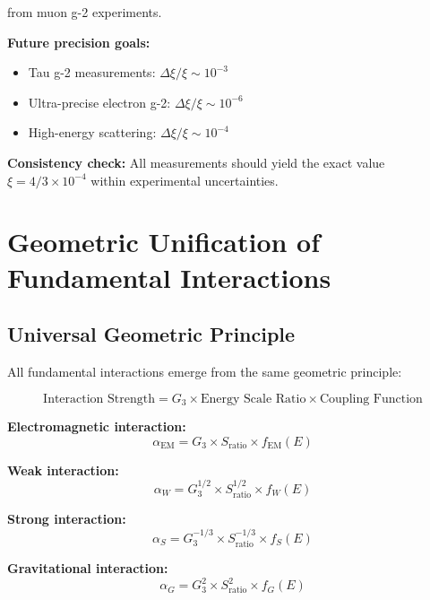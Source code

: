 \documentclass[12pt,a4paper]{report}
\begin{document}
	from muon g-2 experiments.
	
	\textbf{Future precision goals:}
	\begin{itemize}
		\item Tau g-2 measurements: $\Delta\xi/\xi \sim 10^{-3}$
		\item Ultra-precise electron g-2: $\Delta\xi/\xi \sim 10^{-6}$
		\item High-energy scattering: $\Delta\xi/\xi \sim 10^{-4}$
	\end{itemize}
	
	\textbf{Consistency check:}
	All measurements should yield the exact value $\xi = 4/3 \times 10^{-4}$ within experimental uncertainties.
	
	\section{Geometric Unification of Fundamental Interactions}
	\label{sec:geometric_unification}
	
	\subsection{Universal Geometric Principle}
	\label{subsec:universal_geometric_principle}
	
	All fundamental interactions emerge from the same geometric principle:
	
	\begin{equation}
		\text{Interaction Strength} = G_3 \times \text{Energy Scale Ratio} \times \text{Coupling Function}
	\end{equation}
	
	\textbf{Electromagnetic interaction:}
	\begin{equation}
		\alpha_{\text{EM}} = G_3 \times S_{\text{ratio}} \times f_{\text{EM}}(E)
	\end{equation}
	
	\textbf{Weak interaction:}
	\begin{equation}
		\alpha_W = G_3^{1/2} \times S_{\text{ratio}}^{1/2} \times f_W(E)
	\end{equation}
	
	\textbf{Strong interaction:}
	\begin{equation}
		\alpha_S = G_3^{-1/3} \times S_{\text{ratio}}^{-1/3} \times f_S(E)
	\end{equation}
	
	\textbf{Gravitational interaction:}
	\begin{equation}
		\alpha_G = G_3^2 \times S_{\text{ratio}}^2 \times f_G(E)
	\end{equation}
	
\end{document}
